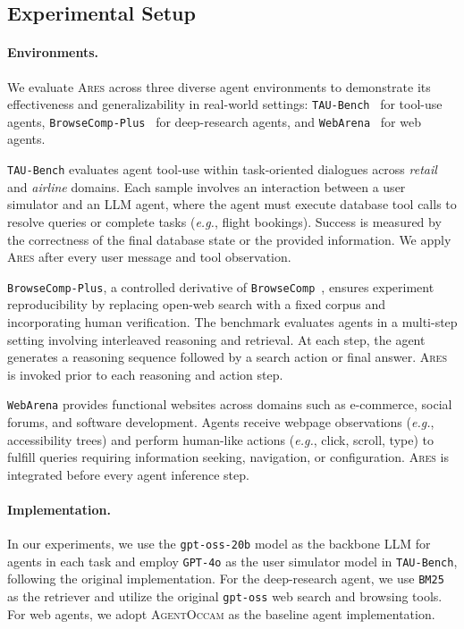 \documentclass{article}
\newcommand{\ares}{\textsc{Ares}}
\theoremstyle{plain}
\theoremstyle{definition}
\theoremstyle{remark}
\begin{document}
\subsection{Experimental Setup}



\paragraph{Environments.}
We evaluate {\ares} across three diverse agent environments to demonstrate its effectiveness and generalizability in real-world settings:  \texttt{TAU-Bench}~\citep{yao2024tau} for tool-use agents,  \texttt{BrowseComp-Plus}~\citep{chen2025browsecomp} for deep-research agents, and  \texttt{WebArena}~\citep{zhou2023webarena} for web agents.

\texttt{TAU-Bench} evaluates agent tool-use within task-oriented dialogues across \emph{retail} and \emph{airline} domains. Each sample involves an interaction between a user simulator and an LLM agent, where the agent must execute database tool calls to resolve queries or complete tasks (\emph{e.g.}, flight bookings). Success is measured by the correctness of the final database state or the provided information. We apply \textsc{Ares} after every user message and tool observation.

\texttt{BrowseComp-Plus}, a controlled derivative of \texttt{BrowseComp}~\citep{wei2025browsecomp}, ensures experiment reproducibility by replacing open-web search with a fixed corpus and incorporating human verification. The benchmark evaluates agents in a multi-step setting involving interleaved reasoning and retrieval. At each step, the agent generates a reasoning sequence followed by a search action or final answer. \textsc{Ares} is invoked prior to each reasoning and action step.

\texttt{WebArena} provides functional websites across domains such as e-commerce, social forums, and software development. Agents receive webpage observations (\emph{e.g.}, accessibility trees) and perform human-like actions (\emph{e.g.}, click, scroll, type) to fulfill queries requiring information seeking, navigation, or configuration. \textsc{Ares} is integrated before every agent inference step.


\paragraph{Implementation.}
In our experiments, we use the \texttt{gpt-oss-20b} model as the backbone LLM for agents in each task and employ \texttt{GPT-4o} as the user simulator model in \texttt{TAU-Bench}, following the original implementation. For the deep-research agent, we use \texttt{BM25} as the retriever and utilize the original \texttt{gpt-oss} web search and browsing tools. For web agents, we adopt \textsc{AgentOccam} as the baseline agent implementation.~\citep{yang2024agentoccam}
\end{document}
